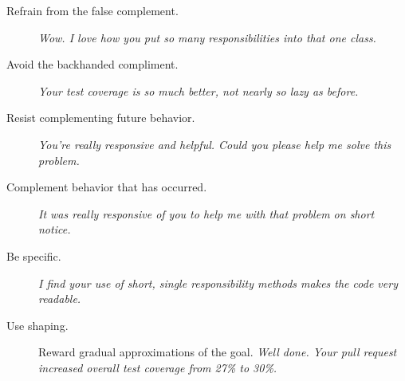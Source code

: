 \documentclass{article}
\begin{document}
\begin{tiny}
\begin{multicols}{3}
\begin{tcolorbox}
        \begin{description}
            \item[Refrain from the false complement.] \emph{Wow. I love how you put so many responsibilities into that one class.}
            \item[Avoid the backhanded compliment.] \emph{Your test coverage is so much better, not nearly so lazy as before.}
            \item[Resist complementing future behavior.] \emph{You're really responsive and helpful. Could you please help me solve this problem.}
            \item[Complement behavior that has occurred.] \emph{It was really responsive of you to help me with that problem on short notice.}
            \item[Be specific.] \emph{I find your use of short, single responsibility methods makes the code very readable.}
            \item[Use shaping.] Reward gradual approximations of the goal. \emph{Well done. Your pull request increased overall test coverage from 27\% to 30\%.}
        \end{description}

    \end{tcolorbox}

    \begin{tcolorbox}[
            enhanced,
            coltitle=black,
            colbacktitle={white},
            colback={white},
            title=Receiving Corrective Feedback,
            colframe=rainbow3
        ]


\end{tcolorbox}
\end{multicols}
\end{tiny}
\end{document}
